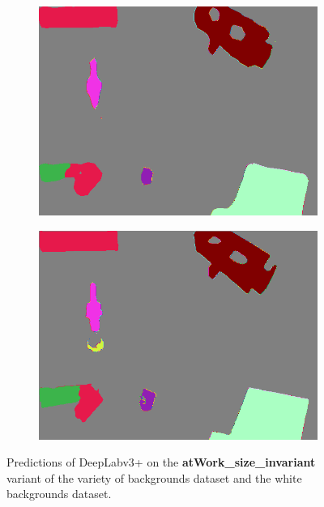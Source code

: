 \begin{figure}[h]
\begin{subfigure}{.24\textwidth}
			\includegraphics[width=1\linewidth]{images/sample_predictions/00017_mob_size_pred}
		\end{subfigure}
		\begin{subfigure}{.24\textwidth}
			\centering
			\includegraphics[width=1\linewidth]{images/sample_predictions/00017_xcep_size_pred}
		\end{subfigure}
		\caption{Predictions of DeepLabv3+ on the \textbf{atWork\_size\_invariant} variant of the variety of backgrounds dataset and the white backgrounds dataset.}
		\label{Fig:sam_size}
	\end{figure}
	
